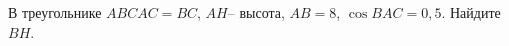 \begin{ex}
	\begin{condition}
		В треугольнике \(ABC AC=BC\), \( AH – \) высота, \( AB=8 \),  \( \cos BAC=0,5 \). Найдите \( BH \).
	\end{condition}
\end{ex}